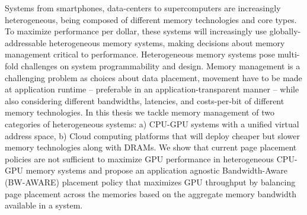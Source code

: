Systems from smartphones, data-centers to supercomputers are increasingly
heterogeneous, being composed of different memory technologies and core types. To maximize
performance per dollar, these systems will increasingly use globally-addressable
heterogeneous memory systems, making decisions about memory management critical
to performance. Heterogeneous memory systems pose multi-fold challenges on
system programmability and design. Memory management is a
challenging problem as choices about data placement, movement have to be made at
application runtime -- preferable in an application-transparent manner -- while also
considering different bandwidths, latencies, and costs-per-bit of different
memory technologies. In this thesis we tackle memory management of two
categories of heterogeneous systems: a) CPU-GPU systems with a unified virtual
address space, b) Cloud computing platforms that will deploy cheaper but
slower memory technologies along with DRAMs.
We show that current page placement policies are not sufficient to maximize GPU
performance in heterogeneous CPU-GPU memory systems and propose an application
agnostic Bandwidth-Aware (BW-AWARE) placement policy that maximizes GPU
throughput by balancing page placement across the memories based on the
aggregate memory bandwidth available in a system.
%
